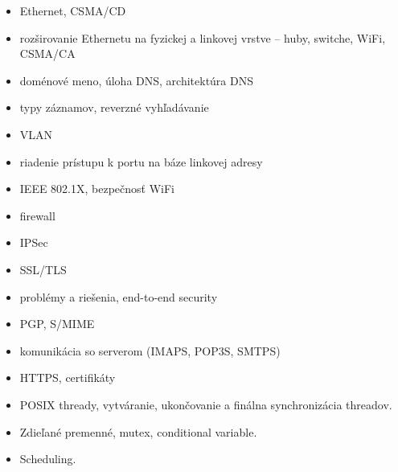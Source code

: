 \documentclass[a4paper]{report}
\begin{document}
\begin{zadanie}
\begin{itemize}
 \item Ethernet, CSMA/CD
 \item rozširovanie Ethernetu na fyzickej a linkovej vrstve – huby, switche, WiFi, CSMA/CA
\end{itemize}
\end{zadanie}

\begin{zadanie}
\begin{itemize}
 \item doménové meno, úloha DNS, architektúra DNS
 \item typy záznamov, reverzné vyhľadávanie
\end{itemize}
\end{zadanie}

\begin{zadanie}
\begin{itemize}
 \item VLAN
 \item riadenie prístupu k portu na báze linkovej adresy
 \item IEEE 802.1X, bezpečnosť WiFi
\end{itemize}
\end{zadanie}

\begin{zadanie}
\begin{itemize}
 \item firewall
 \item IPSec
 \item SSL/TLS
\end{itemize}
\end{zadanie}

\begin{zadanie}
\begin{itemize}
 \item problémy a riešenia, end-to-end security
 \item PGP, S/MIME
 \item komunikácia so serverom (IMAPS, POP3S, SMTPS)
 \item HTTPS, certifikáty
\end{itemize}
\end{zadanie}

\begin{zadanie}
\begin{itemize}
 \item POSIX thready, vytváranie, ukončovanie a finálna synchronizácia threadov.
 \item Zdieľané premenné, mutex, conditional variable.
 \item Scheduling.
\end{itemize}
\end{zadanie}
\end{document}
